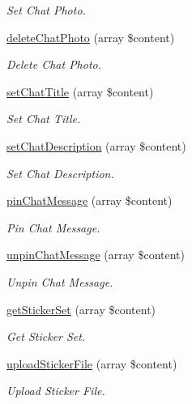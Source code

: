\begin{DoxyCompactItemize}
\begin{DoxyCompactList}\small\item\em Set Chat Photo. \end{DoxyCompactList}\item 
\hyperlink{class_telegram_ae56adc8aed44147e945b6c4c9a16f975}{delete\-Chat\-Photo} (array \$content)
\begin{DoxyCompactList}\small\item\em Delete Chat Photo. \end{DoxyCompactList}\item 
\hyperlink{class_telegram_ac2f5f32ecaf8d6837c1804de6d0ab4b1}{set\-Chat\-Title} (array \$content)
\begin{DoxyCompactList}\small\item\em Set Chat Title. \end{DoxyCompactList}\item 
\hyperlink{class_telegram_adef9a5b1ff9d835244626a4d37064513}{set\-Chat\-Description} (array \$content)
\begin{DoxyCompactList}\small\item\em Set Chat Description. \end{DoxyCompactList}\item 
\hyperlink{class_telegram_a11c2b4c3a2967132d1f39dc06f8d50c1}{pin\-Chat\-Message} (array \$content)
\begin{DoxyCompactList}\small\item\em Pin Chat Message. \end{DoxyCompactList}\item 
\hyperlink{class_telegram_a5457e52eb64d18064484e408bff8ea8f}{unpin\-Chat\-Message} (array \$content)
\begin{DoxyCompactList}\small\item\em Unpin Chat Message. \end{DoxyCompactList}\item 
\hyperlink{class_telegram_a5000eba932fd5faad00805e7014cf986}{get\-Sticker\-Set} (array \$content)
\begin{DoxyCompactList}\small\item\em Get Sticker Set. \end{DoxyCompactList}\item 
\hyperlink{class_telegram_a86adb79b2c6b1bc9b1a786003cf0aaf5}{upload\-Sticker\-File} (array \$content)
\begin{DoxyCompactList}\small\item\em Upload Sticker File. \end{DoxyCompactList}\item 

\end{DoxyCompactItemize}
